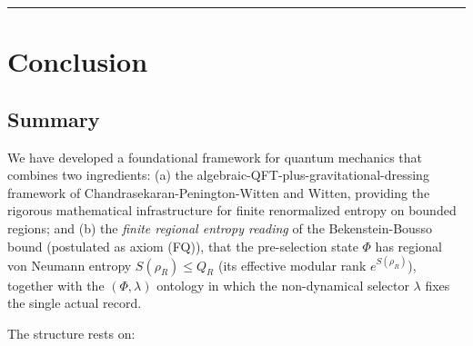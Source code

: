 \documentclass[11pt,a4paper]{article}
\begin{document}
\medskip\hrule\medskip

\section{Conclusion}

\subsection{Summary}

We have developed a foundational framework for quantum mechanics that combines two ingredients: (a) the algebraic-QFT-plus-gravitational-dressing framework of Chandrasekaran-Penington-Witten and Witten, providing the rigorous mathematical infrastructure for finite renormalized entropy on bounded regions; and (b) the \emph{finite regional entropy reading} of the Bekenstein-Bousso bound (postulated as axiom (FQ)), that the pre-selection state $\Phi$ has regional von Neumann entropy $S(\rho_R) \le Q_R$ (its effective modular rank $e^{S(\rho_R)}$), together with the $(\Phi,\lambda)$ ontology in which the non-dynamical selector $\lambda$ fixes the single actual record.

The structure rests on:
\end{document}

